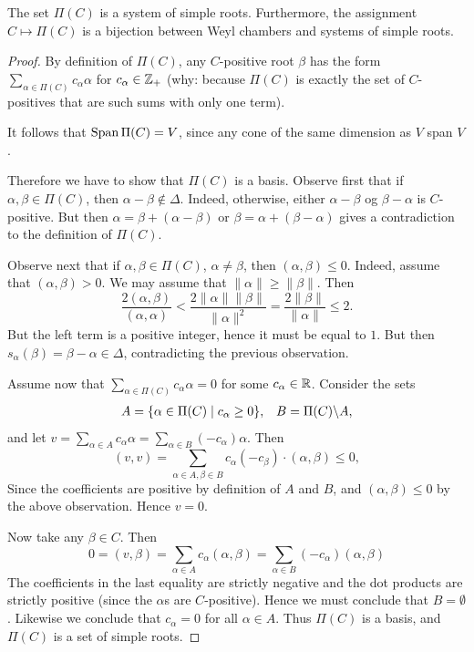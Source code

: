 \documentclass[11pt, english]{article}
\begin{document}
\begin{prop}
  The set $\Pi(C)$ is a system of simple roots. Furthermore, the assignment $C \mapsto \Pi(C)$ is a bijection between Weyl chambers and systems of simple roots.
\end{prop}
\begin{proof}
By definition of $\Pi(C)$, any $C$-positive root $\beta$ has the form $\sum_{\alpha \in \Pi(C)} c_\alpha \alpha$ for $c_\alpha \in \mathbb{Z}_+$ (why: because $\Pi(C)$ is exactly the set of $C$-positives that are such sums with only one term).

It follows that $\operatorname{Span} \Pi(C)=V$, since any cone of the same dimension as $V$ span $V$.

Therefore we have to show that $\Pi(C)$ is a basis. Observe first that if $\alpha,\beta \in \Pi(C)$, then $\alpha-\beta \not \in \Delta$. Indeed, otherwise, either $\alpha-\beta$ og $\beta-\alpha$ is $C$-positive. But then $\alpha=\beta +(\alpha-\beta)$ or $\beta=\alpha+(\beta-\alpha)$ gives a contradiction to the definition of $\Pi(C)$. 

Observe next that if $\alpha,\beta \in \Pi(C)$, $\alpha \neq \beta$, then $(\alpha,\beta) \leq 0$. Indeed, assume that $(\alpha,\beta) > 0$. We may assume that $\| \alpha \| \geq \|\beta \|$. Then
$$
\frac{2 (\alpha,\beta)}{(\alpha,\alpha)} < \frac{2 \| \alpha \| \|\beta \|}{\| \alpha \|^2} = \frac{2 \| \beta \|}{\| \alpha \|} \leq 2.
$$
But the left term is a positive integer, hence it must be equal to $1$.  But then $s_\alpha(\beta) = \beta - \alpha \in \Delta$, contradicting the previous observation.

Assume now that $\sum_{\alpha \in \Pi(C)} c_\alpha \alpha = 0$ for some $c_\alpha \in \mathbb{R}$. Consider the sets
\begin{align*}
  A = \{ \alpha \in \Pi(C) \mid c_\alpha \geq 0 \}, &&  B = \Pi(C) \backslash A,
\end{align*}
and let $v = \sum_{\alpha \in A} c_\alpha \alpha = \sum_{\alpha \in B} (-c_\alpha) \alpha$. Then
$$
(v,v) = \sum_{\alpha \in A, \beta \in B} c_\alpha (-c_\beta) \cdot (\alpha,\beta) \leq 0,
$$
Since the coefficients are positive by definition of $A$ and $B$, and $(\alpha,\beta) \leq 0$ by the above observation. Hence $v=0$. 

Now take any $\beta \in C$. Then
$$
0 = (v,\beta) = \sum_{\alpha \in A} c_\alpha (\alpha, \beta) = \sum_{\alpha \in B} (-c_\alpha)(\alpha,\beta)
$$
The coefficients in the last equality are strictly negative and the dot products are strictly positive (since the $\alpha$s are $C$-positive). Hence we must conclude that $B = \emptyset$. Likewise we conclude that $c_\alpha=0$ for all $\alpha \in A$. Thus $\Pi(C)$ is a basis, and $\Pi(C)$ is a set of simple roots.


\end{proof}
\end{document}
